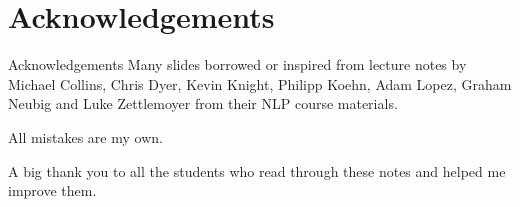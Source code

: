 
\section*{Acknowledgements}

\begin{frame}
\centering
\begin{alertblock}{Acknowledgements}
Many slides borrowed or inspired from lecture notes by Michael Collins, Chris Dyer, Kevin Knight, Philipp Koehn, Adam Lopez, Graham Neubig and Luke Zettlemoyer from their NLP course materials. 

\bigskip

All mistakes are my own.

\bigskip

A big thank you to all the students who read through these notes and helped me improve them.

\end{alertblock}
\end{frame}


